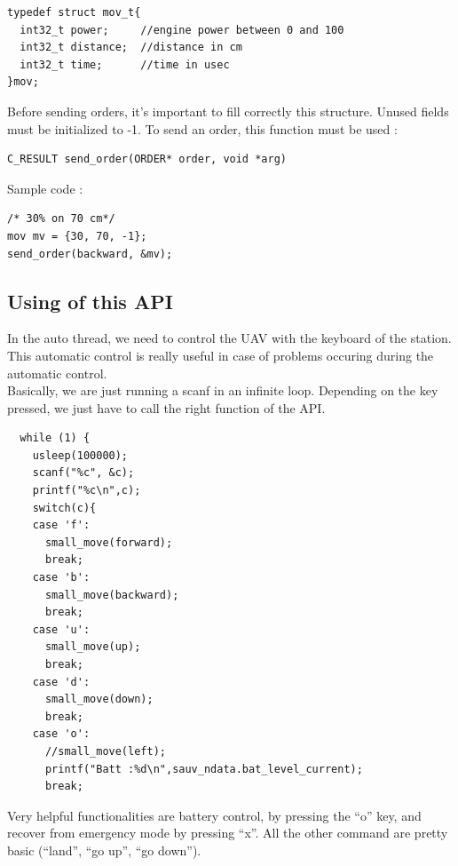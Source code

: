 \begin{lstlisting}
typedef struct mov_t{
  int32_t power;     //engine power between 0 and 100 
  int32_t distance;  //distance in cm
  int32_t time;      //time in usec
}mov;
\end{lstlisting}

Before sending orders, it's important to fill correctly this structure. Unused fields must be initialized to -1. To send an order, this function must be used :\\

\begin{lstlisting}
C_RESULT send_order(ORDER* order, void *arg)
\end{lstlisting}

Sample code :\\

\begin{lstlisting}
/* 30% on 70 cm*/
mov mv = {30, 70, -1};
send_order(backward, &mv);
\end{lstlisting}

\subsection{Using of this API}

In the auto thread, we need to control the UAV with the keyboard of the station. This automatic control is really useful in case of problems occuring during the automatic control.\\

Basically, we are just running a scanf in an infinite loop. Depending on the key pressed, we just have to call the right function of the API.\\

\begin{lstlisting}
  while (1) {
    usleep(100000);
    scanf("%c", &c);
    printf("%c\n",c);
    switch(c){
    case 'f':
      small_move(forward);
      break;
    case 'b':
      small_move(backward);
      break;
    case 'u':
      small_move(up);
      break;
    case 'd':
      small_move(down);
      break;
    case 'o':
      //small_move(left);
      printf("Batt :%d\n",sauv_ndata.bat_level_current);
      break;
\end{lstlisting}

Very helpful functionalities are battery control, by pressing the ``o'' key, and recover from emergency mode by pressing ``x''. All the other command are pretty basic (``land'', ``go up'', ``go down'').\\

